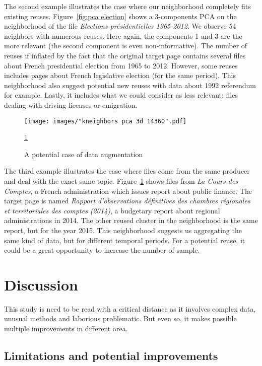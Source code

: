 \documentclass[a4paper]{article}
\begin{document}
	The second example illustrates the case where our neighborhood completely fits existing reuses. Figure~\ref{fig:pca election} shows a 3-components PCA on the neighborhood of the file \emph{Elections présidentielles 1965-2012}. We observe 54 neighbors with numerous reuses. Here again, the components 1 and 3 are the more relevant (the second component is even non-informative). The number of reuses if inflated by the fact that the original target page contains several files about French presidential election from 1965 to 2012. However, some reuses includes pages about French legislative election (for the same period). This neighborhood also suggest potential new reuses with data about 1992 referendum for example. Lastly, it includes what we could consider as less relevant: files dealing with driving licenses or emigration.

	\begin{figure}[]
		\texttt{[image: images/"kneighbors pca 3d 14360".pdf]}
		\caption{A potential case of data augmentation}
		\label{fig:pca compte}
		\ref{fig:pca compte}
	\end{figure}

	The third example illustrates the case where files come from the same producer and deal with the exact same topic. Figure~\ref{fig:pca compte} shows files from \emph{La Cours des Comptes}, a French administration which issues report about public finance. The target page is named \emph{Rapport d'observations définitives des chambres régionales et territoriales des comptes (2014)}, a budgetary report about regional administrations in 2014. The other reused cluster in the neighborhood is the same report, but for the year 2015. This neighborhood suggests us aggregating the same kind of data, but for different temporal periods. For a potential reuse, it could be a great opportunity to increase the number of sample. 
	
	\section{Discussion}
	
	This study is need to be read with a critical distance as it involves complex data, unusual methods and laborious problematic. But even so, it makes possible multiple improvements in different area.
	
	\subsection{Limitations and potential improvements}
	
\end{document}
